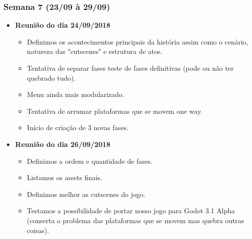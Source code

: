 \documentclass[a4paper, 11pt]{article}
\begin{document}
\subsubsection{Semana 7 (23/09 à 29/09)}
	\begin{itemize} 
		\item \textbf{Reunião do dia 24/09/2018}

		\begin{itemize}
    		
    		\item Definimos os acontecimentos principais da história assim como o cenário, natureza das "cutscenes" e estrutura de atos.
    		\item Tentativa de separar fases teste de fases definitivas (pode ou não ter quebrado tudo).
    		\item Menu ainda mais modularizado.
    		\item Tentativa de arrumar plataformas que se movem one way.
    		\item Início de criação de 3 novas fases.

   		\end{itemize}

		\item \textbf{Reunião do dia 26/09/2018}

		\begin{itemize}
    					
    		\item Definimos a ordem e quantidade de fases.
    		\item Listamos os assets finais.
    		\item Definimos melhor as cutscenes do jogo.
    		\item Testamos a possibilidade de portar nosso jogo para Godot 3.1 Alpha (conserta o problema das plataformas que se movem mas quebra outras coisas).

		\end{itemize}

	\end{itemize}
\end{document}
